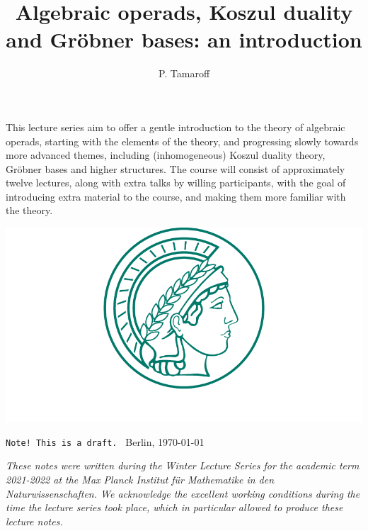 \documentclass[fleqn, a4paper, twoside]{article}
\title{
	\vspace{-5 em}
	\setstretch{0.85}
		{
		\textbf
			{Algebraic operads, 
			Koszul duality and Gr\"obner bases: 
			an introduction}
		}
	}
\author{P. Tamaroff}
\newcommand{\0}{\langle 0\rangle}
\DeclareRobustCommand{\[}{\begin{equation}}%
\DeclareRobustCommand{\]}{\end{equation}}%
\theoremstyle{mytheorem}
\theoremstyle{introthm}
\theoremstyle{mydefinition}
\theoremstyle{mydefinition2}
\theoremstyle{plain} %
\theoremstyle{mytheorem}
\renewenvironment{abstract}{%
\small\begin{center}
\begin{minipage}{.9\textwidth}
}
{\par\noindent\end{minipage}\end{center}\vspace{3 em}}
\newcommand\blankpage{%
    \null
    \thispagestyle{empty}%
    \newpage}
\begin{document}
\pagecolor{pagecolor}
\maketitle
\thispagestyle{empty}

\begin{abstract}
This lecture series aim to offer a gentle introduction to the theory of algebraic 
operads, starting with the elements of the theory, and progressing slowly towards
more advanced themes, including (inhomogeneous) Koszul duality theory, Gr\"obner 
bases and higher structures. The course will consist of approximately twelve 
lectures, along with extra talks by willing participants, with the goal of 
introducing extra material to the course, and making them more familiar with the 
theory.
\end{abstract}

\vspace{2 cm}

\begin{center}
\includegraphics[scale=.35]{images/logoMPG.png}
\end{center}

\vfill
\vfill

\texttt{Note! This is a draft. } \hfill	Berlin, \today


\afterpage{\blankpage}
\newpage

\vspace*{\fill} 

\emph{These notes were written during the Winter Lecture Series for the academic 
term 2021-2022 at the \emph{Max Planck Institut f\"ur Mathematike in den 
Naturwissenschaften}. We acknowledge the excellent working conditions during the 
time the lecture series took place, which in particular allowed to produce these 
lecture notes.}
\end{document}
